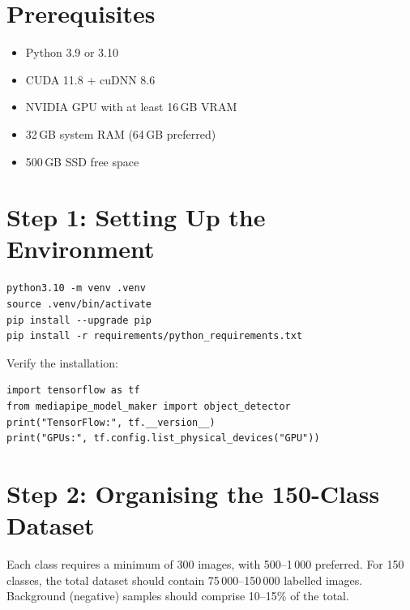 \documentclass[11pt,a4paper]{article}
\begin{document}
\section{Prerequisites}

\begin{itemize}[nosep]
    \item Python 3.9 or 3.10
    \item CUDA 11.8 + cuDNN 8.6
    \item NVIDIA GPU with at least 16\,GB VRAM
    \item 32\,GB system RAM (64\,GB preferred)
    \item 500\,GB SSD free space
\end{itemize}

\section{Step 1: Setting Up the Environment}

\begin{lstlisting}[style=bash, caption={Create virtual environment and install dependencies}]
python3.10 -m venv .venv
source .venv/bin/activate
pip install --upgrade pip
pip install -r requirements/python_requirements.txt
\end{lstlisting}

Verify the installation:

\begin{lstlisting}[style=python, caption={Verify TensorFlow and MediaPipe imports}]
import tensorflow as tf
from mediapipe_model_maker import object_detector
print("TensorFlow:", tf.__version__)
print("GPUs:", tf.config.list_physical_devices("GPU"))
\end{lstlisting}

\section{Step 2: Organising the 150-Class Dataset}

Each class requires a minimum of 300 images, with 500--1\,000 preferred.
For 150 classes, the total dataset should contain 75\,000--150\,000 labelled
images. Background (negative) samples should comprise 10--15\% of the total.
\end{document}

